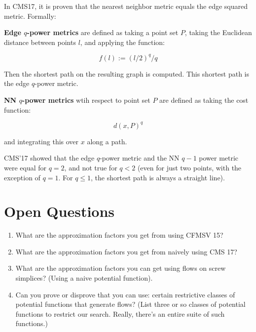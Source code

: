 In CMS17, it is proven that the nearest neighbor metric equals
the edge squared metric. Formally:

\begin{definition}
\textbf{Edge $q$-power metrics} are defined as taking a point set
$P$, taking the Euclidean distance between points $l$, and
applying the function:

\[ f(l) := (l/2)^q/q \]

Then the shortest path on the resulting graph is computed.  This
shortest path is the edge $q$-power metric.
\end{definition}

\begin{definition}
\textbf{NN $q$-power metrics} wtih respect to point set $P$ are defined as taking the cost
function:

\[ d(x, P)^{q} \]

and integrating this over $x$ along a path.
\end{definition}

CMS'17 showed that the edge $q$-power metric and the NN $q-1$
power metric were equal for $q = 2$, and not true for $q < 2$
(even for just two points, with the exception of $q = 1$. For $q
 \leq 1$, the shortest path is always a straight line).

\section{Open Questions}
\begin{enumerate}
\item What are the approximation factors you get from using
CFMSV 15?
\item What are the approximation factors you get from naively
using CMS 17?
\item What are the approximation factors you can get using flows
on screw simplices? (Using a naive potential function).
\item Can you prove or disprove that you can use: certain restrictive classes of
potential functions that generate flows? (List three or so
    classes of potential functions to restrict our search.
    Really, there's an entire suite of such functions.)
\end{enumerate}
